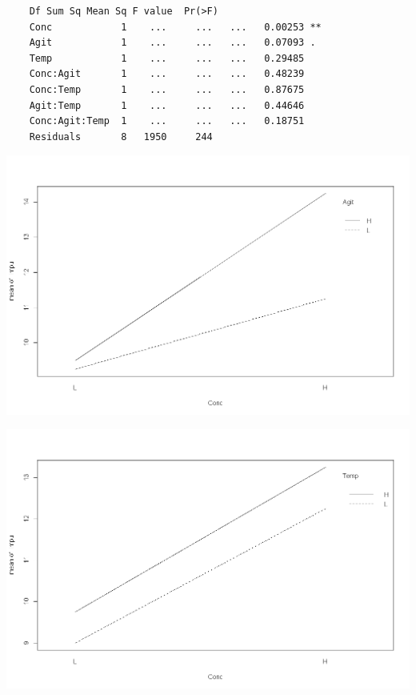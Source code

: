 \documentclass[a4paper,12pt]{article}
\begin{document}
\begin{framed}
	\begin{verbatim}
	Df Sum Sq Mean Sq F value  Pr(>F)
	Conc            1    ...     ...   ...   0.00253 **
	Agit            1    ...     ...   ...   0.07093 .
	Temp            1    ...     ...   ...   0.29485
	Conc:Agit       1    ...     ...   ...   0.48239
	Conc:Temp       1    ...     ...   ...   0.87675
	Agit:Temp       1    ...     ...   ...   0.44646
	Conc:Agit:Temp  1    ...     ...   ...   0.18751
	Residuals       8   1950     244
	\end{verbatim}
\end{framed}

\newpage
\begin{center}
	\includegraphics[scale=0.3]{image/ExamQ6interactiona}
\end{center}
\begin{center}
	\includegraphics[scale=0.3]{image/ExamQ6interactionb}
\end{center}
\end{document}
